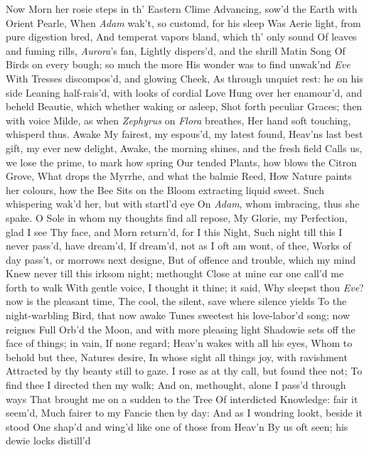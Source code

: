 \documentclass[11pt]{book}
\newcounter {last}
\begin{document}
Now Morn her rosie steps in th' Eastern Clime 
Advancing, sow'd the Earth with Orient Pearle, 
When \textit{Adam} wak't, so customd, for his sleep 
Was Aerie light, from pure digestion bred, 
And temperat vapors bland, which th' only sound 
Of leaves and fuming rills, \textit{Aurora}'s fan, 
Lightly dispers'd, and the shrill Matin Song 
Of Birds on every bough; so much the more 
His wonder was to find unwak'nd \textit{Eve} 
With Tresses discompos'd, and glowing Cheek, 
As through unquiet rest: he on his side 
Leaning half-rais'd, with looks of cordial Love 
Hung over her enamour'd, and beheld 
Beautie, which whether waking or asleep, 
Shot forth peculiar Graces; then with voice 
Milde, as when \textit{Zephyrus} on \textit{Flora} breathes, 
Her hand soft touching, whisperd thus.  Awake 
My fairest, my espous'd, my latest found, 
Heav'ns last best gift, my ever new delight, 
Awake, the morning shines, and the fresh field 
Calls us, we lose the prime, to mark how spring 
Our tended Plants, how blows the Citron Grove, 
What drops the Myrrhe, and what the balmie Reed, 
How Nature paints her colours, how the Bee 
Sits on the Bloom extracting liquid sweet. 
\quad Such whispering wak'd her, but with startl'd eye 
On \textit{Adam}, whom imbracing, thus she spake. 
\quad O Sole in whom my thoughts find all repose, 
My Glorie, my Perfection, glad I see 
Thy face, and Morn return'd, for I this Night, 
Such night till this I never pass'd, have dream'd, 
If dream'd, not as I oft am wont, of thee, 
Works of day pass't, or morrows next designe, 
But of offence and trouble, which my mind 
Knew never till this irksom night; methought 
Close at mine ear one call'd me forth to walk 
With gentle voice, I thought it thine; it said, 
Why sleepst thou \textit{Eve}? now is the pleasant time, 
The cool, the silent, save where silence yields 
To the night-warbling Bird, that now awake 
Tunes sweetest his love-labor'd song; now reignes 
Full Orb'd the Moon, and with more pleasing light 
Shadowie sets off the face of things; in vain, 
If none regard; Heav'n wakes with all his eyes, 
Whom to behold but thee, Natures desire, 
In whose sight all things joy, with ravishment 
Attracted by thy beauty still to gaze. 
I rose as at thy call, but found thee not; 
To find thee I directed then my walk; 
And on, methought, alone I pass'd through ways 
That brought me on a sudden to the Tree 
Of interdicted Knowledge: fair it seem'd, 
Much fairer to my Fancie then by day: 
And as I wondring lookt, beside it stood 
One shap'd and wing'd like one of those from Heav'n 
By us oft seen; his dewie locks distill'd 
\end{document}
